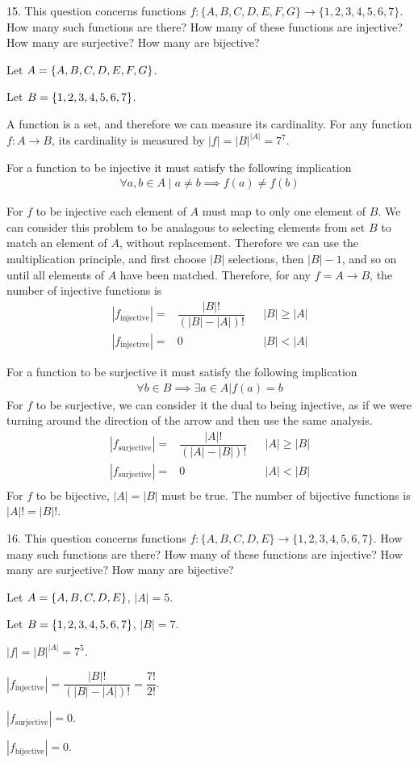 \documentclass{idrisMemo}
\newcommand{\inj}{
\item For a function to be injective it must satisfy the following implication
\begin{align*}
    \forall a,b \in A\mid a\neq b\implies f(a)\neq f(b)
\end{align*}
}
\newcommand{\surj}{
\item For a function to be surjective it must satisfy the following implication
\begin{align*}
    \forall b \in B \implies \exists a \in A | f(a) = b
\end{align*}
}
\begin{document}
\begin{prooflist}{15. This question concerns functions $f:\{A, B, C, D, E, F,
    G\} \rightarrow\{1,2,3,4,5,6,7\}$. How many such functions are there? How
many of these functions are injective? How many are surjective? How many are
bijective?}
\item Let $A= \{A, B, C, D, E, F, G\}$.
\item Let $B= \{1,2,3,4,5,6,7\}$.
\item A function is a set, and therefore we can measure its cardinality. For any
    function $f: A\rightarrow B$, its cardinality is measured by $|f|=|B|^{|A|}=7^7$.
\inj{}
\item For $f$ to be injective each element of $A$ must map to only one element
    of $B$. We can consider this problem to be analagous to selecting elements
    from set $B$ to match an element of $A$, without replacement. Therefore we
    can use the multiplication principle, and first choose $|B|$ selections,
    then $|B|-1$, and so on until all elements of $A$ have been matched.
    Therefore, for any $f=A\rightarrow  B$, the number of injective functions is
    \begin{align*}
    |f_{\text{injective}}| =&\dfrac{|B|!}{(|B|-|A|)!}&&|B|\geq |A|\\
    |f_{\text{injective}}| =&0 &&|B|<|A|
    \end{align*}
\surj{}
For $f$ to be surjective, we can consider it the dual to being injective, as if
we were turning around the direction of the arrow and then use the same
analysis.
    \begin{align*}
        |f_{\text{surjective}}| =&\dfrac{|A|!}{(|A|-|B|)!}&&|A|\geq |B|\\
        |f_{\text{surjective}}| =&0 &&|A|<|B|\\
    \end{align*}
For $f$ to be bijective, $|A|=|B|$ must be true. The number of bijective
functions is $|A|!=|B|!$.

\end{prooflist}

\begin{prooflist}{16. This question concerns functions $f:\{A, B, C, D, E\}
    \rightarrow\{1,2,3,4,5,6,7\}$. How many such functions are there? How many
of these functions are injective? How many are surjective? How many are
bijective?}
\item Let $A= \{A, B, C, D, E\}$, $|A|=5$.
\item Let $B= \{1,2,3,4,5,6,7\}$, $|B|=7$.
\item $|f|=|B|^{|A|}=7^5$.
\item $|f_{\text{injective}}|= \dfrac{|B|!}{(|B|-|A|)!}= \dfrac{7!}{2!}$.
\item $|f_{\text{surjective}}|= 0$.
\item $|f_{\text{bijective}}|= 0$.
\end{prooflist}
\end{document}
